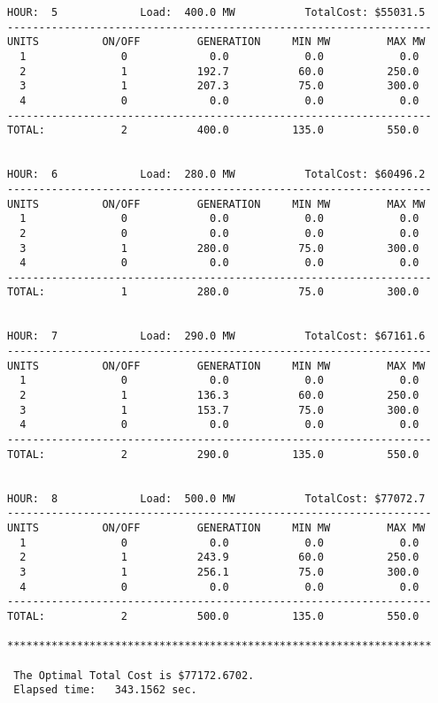 \begin{verbatim}
HOUR:  5             Load:  400.0 MW           TotalCost: $55031.5
-------------------------------------------------------------------
UNITS          ON/OFF         GENERATION     MIN MW         MAX MW
  1               0             0.0            0.0            0.0
  2               1           192.7           60.0          250.0
  3               1           207.3           75.0          300.0
  4               0             0.0            0.0            0.0
-------------------------------------------------------------------
TOTAL:            2           400.0          135.0          550.0


HOUR:  6             Load:  280.0 MW           TotalCost: $60496.2
-------------------------------------------------------------------
UNITS          ON/OFF         GENERATION     MIN MW         MAX MW
  1               0             0.0            0.0            0.0
  2               0             0.0            0.0            0.0
  3               1           280.0           75.0          300.0
  4               0             0.0            0.0            0.0
-------------------------------------------------------------------
TOTAL:            1           280.0           75.0          300.0


HOUR:  7             Load:  290.0 MW           TotalCost: $67161.6
-------------------------------------------------------------------
UNITS          ON/OFF         GENERATION     MIN MW         MAX MW
  1               0             0.0            0.0            0.0
  2               1           136.3           60.0          250.0
  3               1           153.7           75.0          300.0
  4               0             0.0            0.0            0.0
-------------------------------------------------------------------
TOTAL:            2           290.0          135.0          550.0


HOUR:  8             Load:  500.0 MW           TotalCost: $77072.7
-------------------------------------------------------------------
UNITS          ON/OFF         GENERATION     MIN MW         MAX MW
  1               0             0.0            0.0            0.0
  2               1           243.9           60.0          250.0
  3               1           256.1           75.0          300.0
  4               0             0.0            0.0            0.0
-------------------------------------------------------------------
TOTAL:            2           500.0          135.0          550.0

*******************************************************************

 The Optimal Total Cost is $77172.6702.
 Elapsed time:   343.1562 sec.

\end{verbatim}

